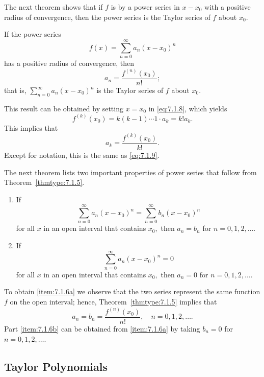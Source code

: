 \documentclass{ximera}
\begin{document}
The next theorem shows that if $f$ is  by a power
series in $x-x_0$ with a positive radius of convergence, then the power
series is the Taylor series of $f$ about $x_0$.

\begin{theorem}\label{thmtype:7.1.5}
If the power series
$$
f(x)=\sum_{n=0}^\infty a_n(x-x_0)^n
$$
has a positive radius of convergence, then
\begin{equation} \label{eq:7.1.9}
a_n=\frac{f^{(n)}(x_0)}{n!};
\end{equation}
that is, $\sum_{n=0}^\infty a_n(x-x_0)^n$ is the Taylor
series of $f$ about $x_0$.
\end{theorem}

This result can be obtained by setting $x=x_0$ in
\eqref{eq:7.1.8}, which yields
$$
f^{(k)}(x_0)=k(k-1)\cdots1\cdot a_k=k!a_k.
$$
This implies that
$$
a_k=\frac{f^{(k)}(x_0)}{k!}.
$$
Except for notation, this is the same as \eqref{eq:7.1.9}.

The next theorem lists two important properties of power series
that follow from Theorem~\ref{thmtype:7.1.5}.

\begin{theorem}\label{thmtype:7.1.6}
\begin{enumerate}
\item\label{item:7.1.6a} %
If
$$
\sum_{n=0}^\infty a_n(x-x_0)^n=\sum_{n=0}^\infty b_n(x-x_0)^n
$$
for all $x$  in an open interval that contains $x_0,$ then
$a_n=b_n$ for $n=0, 1, 2, \dots$.
\item\label{item:7.1.6b} %
If
$$
\sum_{n=0}^\infty a_n(x-x_0)^n=0
$$
 for all $x$ in
an open interval that contains $x_0,$ then $a_n=0$ for
$n=0, 1, 2, \dots$.
\end{enumerate}
\end{theorem}

To obtain \ref{item:7.1.6a} we observe that the two series represent the same function $f$ on the open  interval; hence, Theorem~\ref{thmtype:7.1.5}
implies that
$$
a_n=b_n=\frac{f^{(n)}(x_0)}{n!},\quad n=0,1,2, \dots.
$$
Part \ref{item:7.1.6b}  can be obtained from \ref{item:7.1.6a} by taking $b_n=0$ for
$n=0, 1, 2, \dots$.

\subsection*{Taylor Polynomials}
\end{document}
